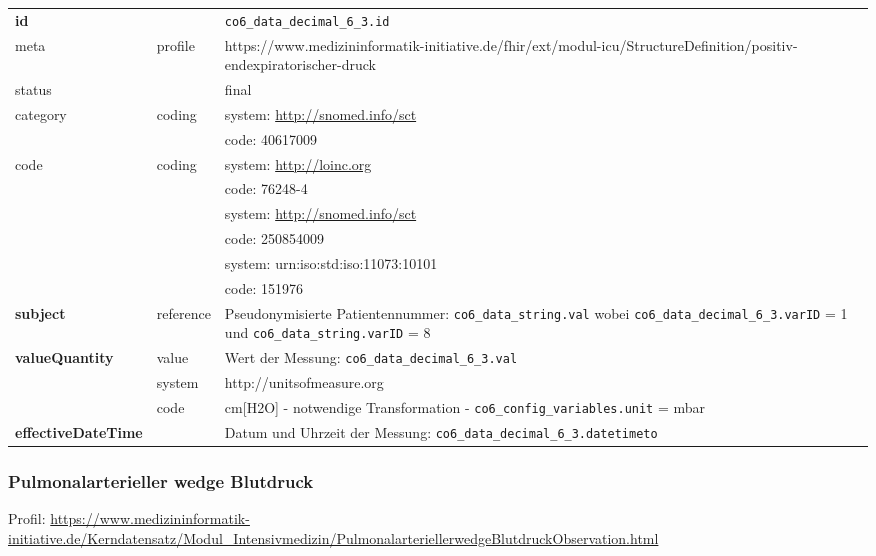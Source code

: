 \begin{longtable}{|l|l|p{7.5cm}|}
        \hline
        \rowcolor{lightgray} \multicolumn{3}{|l|}{Data Mapping (inhaltlich)} \\ \hline
        \textbf{id} &  & \texttt{co6\_data\_decimal\_6\_3.id} \\ \hline
	meta & profile & https://www.medizininformatik-initiative.de/fhir/ext/modul-icu/StructureDefinition/positiv-endexpiratorischer-druck \\ \hline 
	status &  & final   \\ \hline 
	category & coding & system: \url{http://snomed.info/sct} \\
\cline{3-3}
	& & code: 40617009 \\ \hline
	code & coding & system: \url{http://loinc.org} \\ 
	\cline{3-3} 
	&  & code: 76248-4 \\ 
	\cline{3-3} 
	&  & system: \url{http://snomed.info/sct} \\ 
	\cline{3-3}
	&  & code: 250854009 \\ 
	\cline{3-3} 
	&  & system: urn:iso:std:iso:11073:10101 \\ 
	\cline{3-3}
	&  & code: 151976 \\ \hline
	 \textbf{subject} & reference & Pseudonymisierte Patientennummer: \texttt{co6\_data\_string.val} wobei \texttt{co6\_data\_decimal\_6\_3.varID} = 1 und \texttt{co6\_data\_string.varID} = 8 \\ \hline
	 \textbf{valueQuantity}  & value & Wert der Messung: \texttt{co6\_data\_decimal\_6\_3.val} \\
        \cline{2-3}
         & system & http://unitsofmeasure.org \\
         \cline{2-3}
         & code & cm[H2O] - notwendige Transformation - \texttt{co6\_config\_variables.unit} = mbar \\ \hline
     \textbf{effectiveDateTime}  & & Datum und Uhrzeit der Messung: \texttt{co6\_data\_decimal\_6\_3.datetimeto} \\ \hline
\end{longtable}


\subsubsection{Pulmonalarterieller wedge Blutdruck} 
Profil: \url{https://www.medizininformatik-initiative.de/Kerndatensatz/Modul_Intensivmedizin/PulmonalarteriellerwedgeBlutdruckObservation.html}

